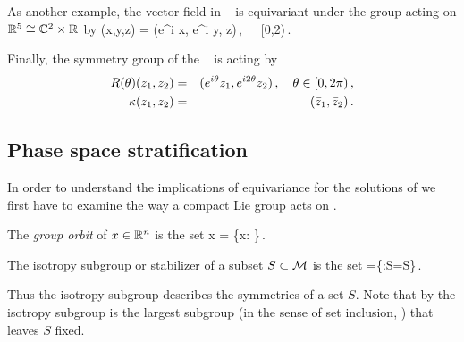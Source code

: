 As another example, the vector field in \CLe\  is equivariant under the group  acting on $\mathbb{R}^{5}\cong \mathbb{C}^{2}\times \mathbb{R}^{}$
by
\beq
 \Rot{\theta} (x,y,z) = (e^{i\theta} x, e^{i\theta} y, z)\,,\ \ \  \theta\in[0,2\pi)\,.
 \label{eq:RotCLe}
\eeq

Finally, the symmetry group of the \AGHe~ is  acting by
\begin{eqnarray*}
  R(\theta)(z_1,z_2) &=& (e^{i\theta} z_1, e^{i 2\theta} z_2)\,,\ \ \  \theta\in[0,2\pi)\,,\\
  \kappa(z_1,z_2) &=& (\bar{z}_1,\bar{z}_2)\,.
\end{eqnarray*}


\subsection{Phase space stratification}

In order to understand the implications of equivariance for the solutions
of  we first have to examine the way a compact
Lie group acts on .

 The \emph{group orbit} of $x\in\mathbb{R}^{n}$ is the set
\beq
	\Gamma x = \{\gamma x: \gamma\in\Gamma\}\,.
\eeq


\begin{definition}
\label{def:stab}
 The isotropy subgroup or stabilizer of a subset $S\subset \mathcal{M}$ is the set
 \beq
  	=\{\gamma\in\Gamma:\gamma S=S\}\,.
 \eeq
\end{definition}
Thus the isotropy subgroup describes the symmetries of a set $S$. Note that by
 the isotropy subgroup is the largest subgroup (in the
sense of set inclusion, \cf {}) that leaves $S$ fixed.



